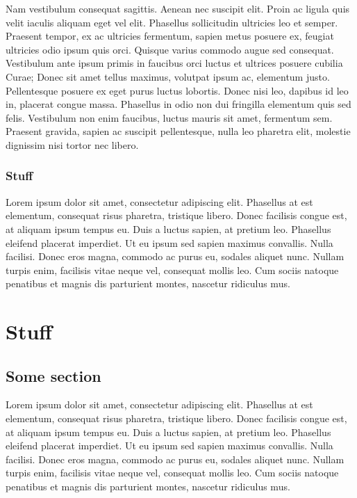 \documentclass[12pt,oneside]{report}
\begin{document}
Nam vestibulum consequat sagittis. Aenean nec suscipit elit. Proin ac ligula
quis velit iaculis aliquam eget vel elit. Phasellus sollicitudin ultricies leo
et semper. Praesent tempor, ex ac ultricies fermentum, sapien metus posuere ex,
feugiat ultricies odio ipsum quis orci. Quisque varius commodo augue sed
consequat. Vestibulum ante ipsum primis in faucibus orci luctus et ultrices
posuere cubilia Curae; Donec sit amet tellus maximus, volutpat ipsum ac,
elementum justo. Pellentesque posuere ex eget purus luctus lobortis. Donec nisi
leo, dapibus id leo in, placerat congue massa. Phasellus in odio non dui
fringilla elementum quis sed felis. Vestibulum non enim faucibus, luctus mauris
sit amet, fermentum sem. Praesent gravida, sapien ac suscipit pellentesque,
nulla leo pharetra elit, molestie dignissim nisi tortor nec libero.

\subsection{Stuff}
Lorem ipsum dolor sit amet, consectetur adipiscing elit. Phasellus at est
elementum, consequat risus pharetra, tristique libero. Donec facilisis congue
est, at aliquam ipsum tempus eu. Duis a luctus sapien, at pretium leo. Phasellus
eleifend placerat imperdiet. Ut eu ipsum sed sapien maximus convallis. Nulla
facilisi. Donec eros magna, commodo ac purus eu, sodales aliquet nunc. Nullam
turpis enim, facilisis vitae neque vel, consequat mollis leo. Cum sociis natoque
penatibus et magnis dis parturient montes, nascetur ridiculus mus.

\cleardoublepage


 
\cleardoublepage

\appendix
\chapter{Stuff}
\section{Some section}
Lorem ipsum dolor sit amet, consectetur adipiscing elit. Phasellus at est
elementum, consequat risus pharetra, tristique libero. Donec facilisis congue
est, at aliquam ipsum tempus eu. Duis a luctus sapien, at pretium leo. Phasellus
eleifend placerat imperdiet. Ut eu ipsum sed sapien maximus convallis. Nulla
facilisi. Donec eros magna, commodo ac purus eu, sodales aliquet nunc. Nullam
turpis enim, facilisis vitae neque vel, consequat mollis leo. Cum sociis natoque
penatibus et magnis dis parturient montes, nascetur ridiculus mus.
\end{document}
